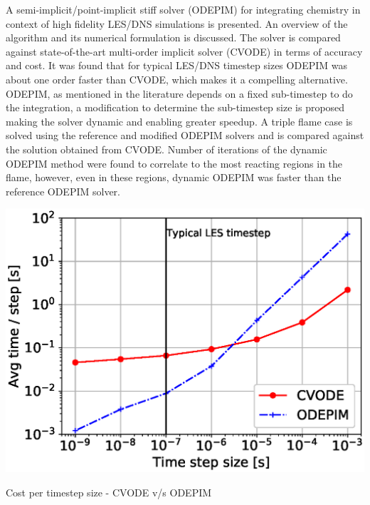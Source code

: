 \documentclass[a0paper,portrait]{baposter}
\begin{document}
\begin{poster}
{        A semi-implicit/point-implicit stiff solver (ODEPIM) for integrating chemistry in context of high fidelity LES/DNS simulations is presented. An overview of the algorithm and its numerical formulation is discussed. The solver is compared against state-of-the-art multi-order implicit solver (CVODE) in terms of accuracy and cost. It was found that for typical LES/DNS timestep sizes ODEPIM was about one order faster than CVODE, which makes it a compelling alternative. ODEPIM, as mentioned in the literature depends on a fixed sub-timestep to do the integration, a modification to determine the sub-timestep size is proposed making the solver dynamic and enabling greater speedup. A triple flame case is solved using the reference and modified ODEPIM solvers and is compared against the solution obtained from CVODE. Number of iterations of the dynamic ODEPIM method were found to correlate to the most reacting regions in the flame, however, even in these regions, dynamic ODEPIM was faster than the reference ODEPIM solver. 
 

        \includegraphics[width=0.8\linewidth]{time.eps}
        \caption{Cost per timestep size - CVODE v/s ODEPIM}

		}
		
		
		
\end{poster}
\end{document}
